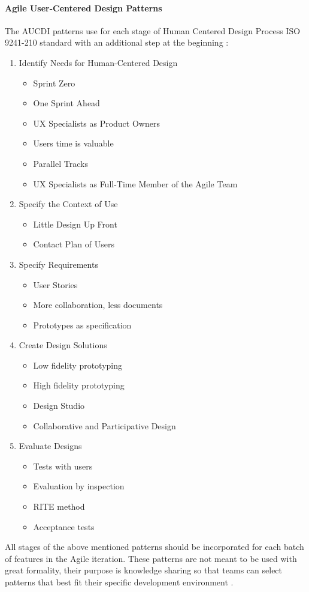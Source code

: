 \documentclass{article}
\begin{document}
\paragraph{Agile User-Centered Design Patterns}
The AUCDI patterns use for each stage of Human Centered Design Process ISO 9241-210 standard with an additional step at the beginning \citep{bertholdo2014Agile}\citep{bertholdo2016Agile}:
\begin{enumerate}
 \item Identify Needs for Human-Centered Design
 \begin{itemize}
     \item Sprint Zero
     \item One Sprint Ahead
     \item UX Specialists as Product Owners 
     \item Users time is valuable
     \item Parallel Tracks
     \item UX Specialists as Full-Time Member of the Agile Team
 \end{itemize}
 \item Specify the Context of Use
 \begin{itemize}
     \item Little Design Up Front
     \item Contact Plan of Users
 \end{itemize}
 \item Specify Requirements
 \begin{itemize}
     \item User Stories
     \item More collaboration, less documents
     \item Prototypes as specification
 \end{itemize}
 \item Create Design Solutions
 \begin{itemize}
     \item Low fidelity prototyping
     \item High fidelity prototyping
     \item Design Studio
     \item Collaborative and Participative Design
 \end{itemize}
 \item Evaluate Designs
 \begin{itemize}
     \item Tests with users
     \item Evaluation by inspection
     \item RITE method
     \item Acceptance tests
 \end{itemize}
\end{enumerate}
All stages of the above mentioned patterns should be incorporated for each batch of features in the Agile iteration. These patterns are not meant to be used with great formality, their purpose is knowledge sharing so that teams can select patterns that best fit their specific development environment \citep{bertholdo2016Agile}.
\end{document}
